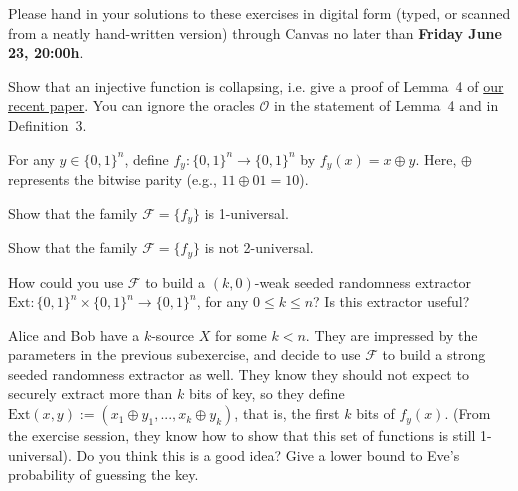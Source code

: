 \documentclass[a4paper,10pt,landscape,twocolumn]{scrartcl}
\newcommand\deadline{Friday June 23, 20:00h}
\begin{document}
\newcommand{\Hmin}{\mathrm{H}_{\mathrm{min}}}

\homeworkproblems

{\sffamily\noindent
Please hand in your solutions to these exercises in digital form (typed, or scanned from a neatly hand-written version) through Canvas no later than \textbf{\deadline}.  %
}
\begin{exercise}
Show that an injective function is collapsing, i.e. give a proof of Lemma~4 of \href{https://eprint.iacr.org/2017/771.pdf}{our recent paper}. You can ignore the oracles $\mathcal{O}$ in the statement of Lemma~4 and in Definition~3.
\end{exercise}


\begin{exercise}
	For any $y \in \{0,1\}^n$, define $f_y : \{0,1\}^n \to \{0,1\}^n$ by $f_y(x) = x \oplus y$. Here, $\oplus$ represents the bitwise parity (e.g., $11 \oplus 01 = 10$).
	\begin{subex}
		Show that the family $\mathscr{F} = \{f_y\}$ is 1-universal.
	\end{subex}
    \begin{subex}
        Show that the family $\mathscr{F} = \{f_y\}$ is not 2-universal.
    \end{subex}
    \begin{subex}
    	How could you use $\mathscr{F}$ to build a $(k,0)$-weak seeded randomness extractor $\text{Ext} : \{0,1\}^n \times \{0,1\}^n \to \{0,1\}^n$, for any $0 \leq k \leq n$? Is this extractor useful?
    \end{subex}
    \begin{subex}
    	Alice and Bob have a $k$-source $X$ for some $k < n$. They are impressed by the parameters in the previous subexercise, and decide to use $\mathscr{F}$ to build a strong seeded randomness extractor as well. They know they should not expect to securely extract more than $k$ bits of key, so they define $\text{Ext}(x,y) := (x_1 \oplus y_1, ..., x_k \oplus y_k)$, that is, the first $k$ bits of $f_y(x)$. (From the exercise session, they know how to show that this set of functions is still 1-universal). Do you think this is a good idea? Give a lower bound to Eve's probability of guessing the key.
    \end{subex}
\end{exercise}
\end{document}
